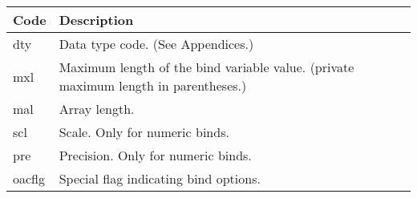 \begin{longtable}[]{@{}l|l@{}}
\toprule
\begin{minipage}[b]{0.14\columnwidth}\raggedright\strut
Code\strut
\end{minipage} & \begin{minipage}[b]{0.65\columnwidth}\raggedright\strut
Description\strut
\end{minipage}\tabularnewline
\midrule
\endhead
\begin{minipage}[t]{0.14\columnwidth}\raggedright\strut
dty\strut
\end{minipage} & \begin{minipage}[t]{0.65\columnwidth}\raggedright\strut
Data type code. (See Appendices.)\strut
\end{minipage}\tabularnewline
\begin{minipage}[t]{0.14\columnwidth}\raggedright\strut
mxl\strut
\end{minipage} & \begin{minipage}[t]{0.65\columnwidth}\raggedright\strut
Maximum length of the bind variable value. (private maximum length in
parentheses.)\strut
\end{minipage}\tabularnewline
\begin{minipage}[t]{0.14\columnwidth}\raggedright\strut
mal\strut
\end{minipage} & \begin{minipage}[t]{0.65\columnwidth}\raggedright\strut
Array length.\strut
\end{minipage}\tabularnewline
\begin{minipage}[t]{0.14\columnwidth}\raggedright\strut
scl\strut
\end{minipage} & \begin{minipage}[t]{0.65\columnwidth}\raggedright\strut
Scale. Only for numeric binds.\strut
\end{minipage}\tabularnewline
\begin{minipage}[t]{0.14\columnwidth}\raggedright\strut
pre\strut
\end{minipage} & \begin{minipage}[t]{0.65\columnwidth}\raggedright\strut
Precision. Only for numeric binds.\strut
\end{minipage}\tabularnewline
\begin{minipage}[t]{0.14\columnwidth}\raggedright\strut
oacflg\strut
\end{minipage} & \begin{minipage}[t]{0.65\columnwidth}\raggedright\strut
Special flag indicating bind options.\strut
\end{minipage}\tabularnewline

\end{longtable}
